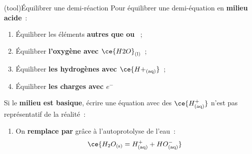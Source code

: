 \documentclass[../../main/main.tex]{subfiles}
\begin{document}
\begin{tcb*}(tool){Équilibrer une demi-réaction}
	Pour équilibrer une demi-équation en \textbf{milieu acide}~:
	\begin{enumerate}[label=\sqenumi]
		\item Équilibrer les éléments \textbf{autres que  ou }~;
		\item Équilibrer \textbf{l'oxygène avec $\ce{H2O}_{\rm(l)}$}~;
		\item Équilibrer \textbf{les hydrogènes avec $\ce{H+_{\rm(aq)}}$}~;
		\item Équilibrer \textbf{les charges avec $e^-$}
	\end{enumerate}
	Si le \textbf{milieu est basique}, écrire une équation avec des
	$\ce{{H}^+_{\rm(aq)}}$ n'est pas représentatif de la réalité~:
	\begin{enumerate}[label=\sqenumi, resume]
		\item On \textbf{remplace  par } grâce à l'autoprotolyse de
		      l'eau~:
		      \[
			      \ce{H_2O_{\rm(s)} = H^+_{\rm(aq)} + HO^-_{\rm(aq)}}
		      \]
	\end{enumerate}
\end{tcb*}
\end{document}
